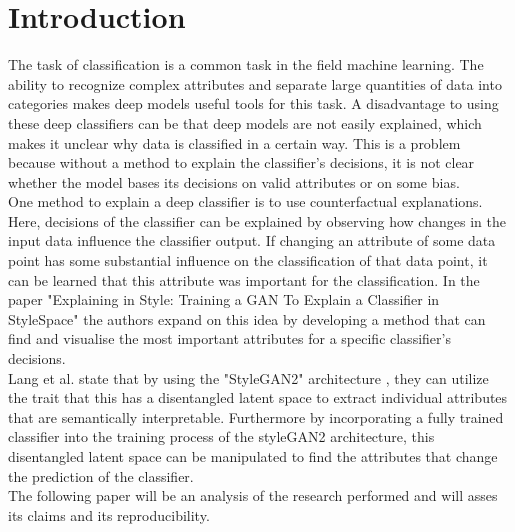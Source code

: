 \section{Introduction}
\label{sec:introduction}


The task of classification is a common task in the field machine learning. The ability to recognize complex attributes and separate large quantities of data into categories makes deep models useful tools for this task. A disadvantage to using these deep classifiers can be that deep models are not easily explained, which makes it unclear why data is classified in a certain way. This is a problem because without a method to explain the classifier's decisions, it is not clear whether the model bases its decisions on valid attributes or on some bias.
\\
One method to explain a deep classifier is to use counterfactual explanations.\cite{10.1145/3351095.3372850} \cite{DBLP:journals/corr/abs-2010-10596} Here, decisions of the classifier can be explained by observing how changes in the input data influence the classifier output. If changing an attribute of some data point has some substantial influence on the classification of that data point, it can be learned that this attribute was important for the classification. In the paper "Explaining in Style: Training a GAN To Explain a Classifier in StyleSpace" \cite{explaining_in_style} the authors expand on this idea by developing a method that can find and visualise the most important attributes for a specific classifier's decisions.\\
Lang et al. state that by using the "StyleGAN2" architecture \cite{karras2020analyzing}, they can utilize the trait that this has a disentangled latent space \cite{Wu_2021_CVPR} to extract individual attributes that are semantically interpretable. Furthermore by incorporating a fully trained classifier into the training process of the styleGAN2 architecture, this disentangled latent space can be manipulated to find the attributes that change the prediction of the classifier.
\\ The following paper will be an analysis of the research performed and will asses its claims and its reproducibility.


